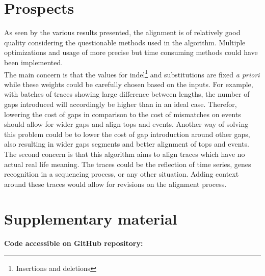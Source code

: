 \documentclass[12pt,a4paper]{article}
\begin{document}


\section{Prospects}

As seen by the various results presented, the alignment is of relatively good quality considering the questionable methods used in the algorithm. Multiple optimizations and usage of more precise but time consuming methods could have been implemented.\\

The main concern is that the values for indel\footnote{Insertions and deletions} and substitutions are fixed \emph{a priori} while these weights could be carefully chosen based on the inputs.
For example, with batches of traces showing large difference between lengths, the number of gaps introduced will accordingly be higher than in an ideal case.
Therefor, lowering the cost of gaps in comparison to the cost of mismatches on events should allow for wider gaps and align tops and events.
Another way of solving this problem could be to lower the cost of gap introduction around other gaps, also resulting in wider gaps segments and better alignment of tops and events.\\

The second concern is that this algorithm aims to align traces which have no actual real life meaning.
The traces could be the reflection of time series, genes recognition in a sequencing process, or any other situation.
Adding context around these traces would allow for revisions on the alignment process.

\pagebreak




\section*{Supplementary material}

\noindent\footnotesize{\textbf{Code accessible on GitHub repository:}
\href{https://github.com/Damien-Garcia-Bioinformatics/aap\_mma\_project}{\color{blue}{https://github.com/Damien-Garcia-Bioinformatics/aap\_mma\_project}}}
\end{document}

